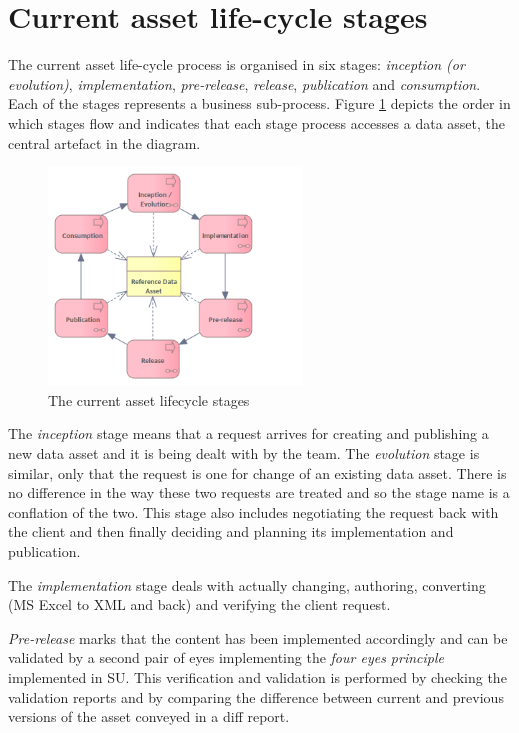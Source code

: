 	\section{Current asset life-cycle stages}
	\label{sec:lifecycle-current-stages}
	
	The current asset life-cycle process is organised in six stages: \textit{inception (or evolution)}, \textit{implementation}, \textit{pre-release}, \textit{release}, \textit{publication} and \textit{consumption}. Each of the stages represents a business sub-process. Figure \ref{fig:lifecycle-current-stages} depicts the order in which stages flow and indicates that each stage process accesses a data asset, the central artefact in the diagram.
	
	\begin{figure}[h]
		\centering
		\includegraphics[width=0.6\textwidth]{images/business/Lifecycle process only (current).png}
		\caption{The current asset lifecycle stages}
		\label{fig:lifecycle-current-stages}
	\end{figure} 

	The \textit{inception} stage means that a request arrives for creating and publishing a new data asset and it is being dealt with by the team. The \textit{evolution} stage is similar, only that the request is one for change of an existing data asset. There is no difference in the way these two requests are treated and so the stage name is a conflation of the two. This stage also includes negotiating the request back with the client and then finally deciding and planning its implementation and publication. 
	
	The \textit{implementation} stage deals with actually changing, authoring, converting (MS Excel to XML and back) and verifying the client request. 
	
	\textit{Pre-release} marks that the content has been implemented accordingly and can be validated by a second pair of eyes implementing the \textit{four eyes principle} implemented in SU. This verification and validation is performed by checking the validation reports and by comparing the difference between current and previous versions of the asset conveyed in a diff report. 
	
